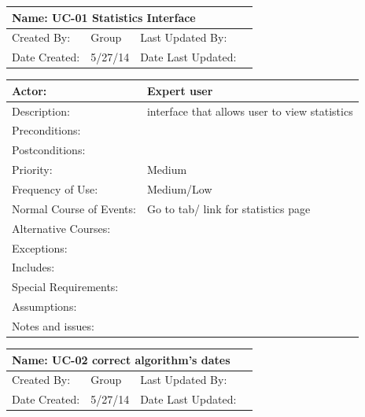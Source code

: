 \documentclass[11pt]{article}
\begin{document}
\begin{tabularx}{\textwidth}{|l|X|X|X|}
\hline
\multicolumn{4}{|l|}{Name: UC-01    Statistics Interface
}\\\hline
Created By: & Group & Last Updated By: &  \\\hline
Date Created: & 5/27/14 & Date Last Updated: &  \\\hline	
\end{tabularx}

\begin{tabularx}{\textwidth}{|l|X|}
\hline
Actor: & Expert user \\\hline
Description: & interface that allows user to view statistics\\\hline
Preconditions: & \\\hline
Postconditions: & \\\hline
Priority: & Medium \\\hline
Frequency of Use: & Medium/Low \\\hline
Normal Course of Events: & Go to tab/ link for statistics page\\\hline
Alternative Courses: & \\\hline
Exceptions: & \\\hline
Includes: & \\\hline
Special Requirements: & \\\hline
Assumptions: & \\\hline
Notes and issues: & \\\hline
\end{tabularx}
\newpage

\begin{tabularx}{\textwidth}{|l|X|X|X|}
\hline
\multicolumn{4}{|l|}{Name: UC-02    correct algorithm’s dates}\\\hline
Created By: & Group & Last Updated By: &  \\\hline
Date Created: & 5/27/14 & Date Last Updated: &  \\\hline	
\end{tabularx}
\end{document}
